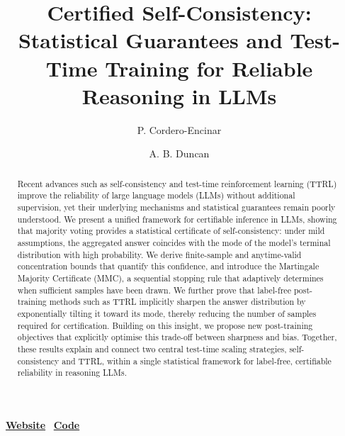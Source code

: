 \documentclass{article} %
\title{\centering \textbf{Certified Self-Consistency:}\\ Statistical Guarantees and Test-Time Training for Reliable Reasoning in LLMs}
\author[ ]{P. Cordero-Encinar}
\author[ ]{A. B. Duncan}
\affil[ ]{Department of Mathematics, Imperial College London, UK.}
\affil[ ]{\textit{\{paula.cordero-encinar22, a.duncan\}@imperial.ac.uk}}
\begin{document}
\maketitle
\vspace{-30pt}
\begin{center}
\faBook\ \href{https://paulaoak.github.io/certified_self_consistency_website/}{\textbf{Website}} \quad
\faGithub\ \href{https://github.com/paulaoak/certified_self_consistency}{\textbf{Code}}
\end{center}

\vspace{15pt}
\begin{abstract}
Recent advances such as self-consistency and test-time reinforcement learning (TTRL) improve the reliability of large language models (LLMs) without additional supervision, yet their underlying mechanisms and statistical guarantees remain poorly understood.
We present a unified framework for certifiable inference in LLMs, showing that majority voting provides a statistical certificate of self-consistency: under mild assumptions, the aggregated answer coincides with the mode of the model’s terminal distribution with high probability. We derive finite-sample and anytime-valid concentration bounds that quantify this confidence, and introduce the Martingale Majority Certificate (MMC), a sequential stopping rule that adaptively determines when sufficient samples have been drawn.
We further prove that label-free post-training methods such as TTRL implicitly sharpen the answer distribution by exponentially tilting it toward its mode, thereby reducing the number of samples required for certification. Building on this insight, we propose new post-training objectives that explicitly optimise this trade-off between sharpness and bias.  Together, these results explain and connect two central test-time scaling strategies, self-consistency and TTRL,  within a single statistical framework for label-free, certifiable reliability in reasoning LLMs.
\end{abstract}
\end{document}
